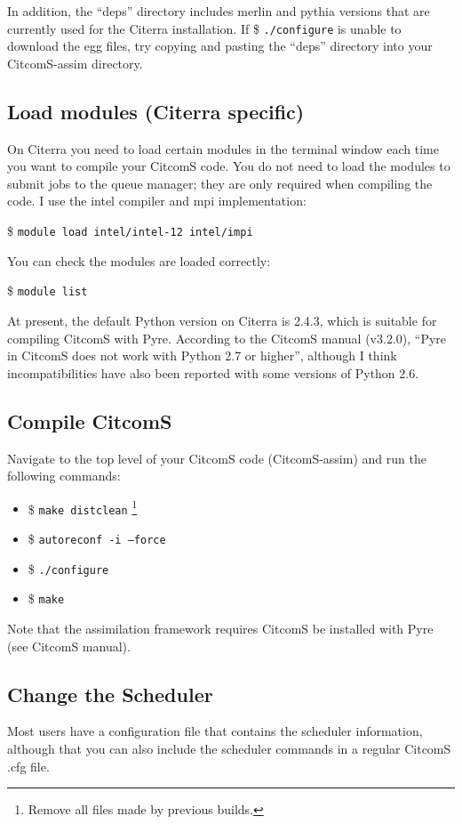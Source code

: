 \documentclass[letterpaper,12pt]{article}
\newcommand{\tm}[1]{\$ \texttt{#1}}
\begin{document}
In addition, the ``deps'' directory includes merlin and pythia versions that are currently used for the Citerra installation.  If \tm{./configure} is unable to download the egg files, try copying and pasting the ``deps'' directory into your CitcomS-assim directory.

\subsection{Load modules (Citerra specific)}
On Citerra you need to load certain modules in the terminal window each time you want to compile your CitcomS code.  You do not need to load the modules to submit jobs to the queue manager; they are only required when compiling the code.  I use the intel compiler and mpi implementation:

\tm{module load intel/intel-12 intel/impi}

You can check the modules are loaded correctly:

\tm{module list}

At present, the default Python version on Citerra is 2.4.3, which is suitable for compiling CitcomS with Pyre.  According to the CitcomS manual (v3.2.0), ``Pyre in CitcomS does not work with Python 2.7 or higher'', although I think incompatibilities have also been reported with some versions of Python 2.6.
\subsection{Compile CitcomS}
Navigate to the top level of your CitcomS code (CitcomS-assim) and run the following commands:
\begin{itemize}
\item \tm{make distclean} \footnote{Remove all files made by previous builds.}
\item \tm{autoreconf -i --force}
\item \tm{./configure}
\item \tm{make}
\end{itemize}

Note that the assimilation framework requires CitcomS be installed with Pyre (see CitcomS manual).
\subsection{Change the Scheduler}
Most users have a configuration file that contains the scheduler information, although that you can also include the scheduler commands in a regular CitcomS .cfg file.
\end{document}
